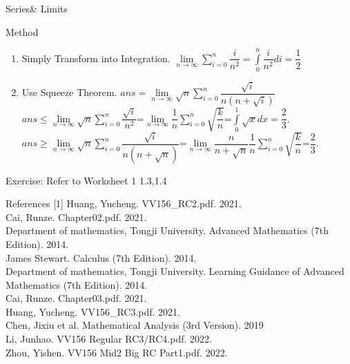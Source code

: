 \begin{frame}{Series\& Limits}

    \begin{block}{Method}
        \begin{enumerate}
            \item Simply Transform into Integration.
                  $\lim\limits_{n\to\infty}\sum\limits_{i=0}^{n}\dfrac{i}{n^2}=\int\limits_0^n \dfrac{i}{n^2} di=\dfrac{1}{2} $
            \item Use Squeeze Theorem.
                  $ans=\lim\limits_{n\to\infty}\sqrt{n}\sum\limits_{i=0}^{n}\dfrac{\sqrt{i}}{n(n+\sqrt{i})}$\\
                  $ans\leq\lim\limits_{n\to\infty}\sqrt{n}\sum\limits_{i=0}^{n}\dfrac{\sqrt{i}}{n^2}$=$\lim\limits_{n\to\infty}\dfrac{1}{n}\sum\limits_{i=0}^{n}\sqrt{\dfrac{k}{n}}$=$\int\limits_0^1 \sqrt{x}dx=\dfrac{2}{3}$.\\
                  $ans\geq \lim\limits_{n\to\infty}\sqrt{n}\sum\limits_{i=0}^{n}\dfrac{\sqrt{i}}{n(n+\sqrt{n})}$=$\lim\limits_{n\to\infty}\dfrac{n}{n+\sqrt{n}}\dfrac{1}{n}\sum\limits_{i=0}^{n}\sqrt{\dfrac{k}{n}}$=$\dfrac{2}{3}$.
        \end{enumerate}
    \end{block}
    Exercise: Refer to Worksheet 1 1.3,1.4
\end{frame}



\begin{frame}{References}
    \footnotesize
    [1] Huang, Yucheng. VV156\_RC2.pdf. 2021.\\
    \bigskip
    [2] Cai, Runze. Chapter02.pdf. 2021.\\
    \bigskip
    [3] Department of mathematics, Tongji University. Advanced Mathematics (7th Edition). 2014.\\
    \bigskip
    [4] James Stewart. Calculus (7th Edition). 2014.\\
    \bigskip
    [5] Department of mathematics, Tongji University. Learning Guidance of Advanced Mathematics (7th Edition). 2014.\\
    \bigskip
    [6] Cai, Runze. Chapter03.pdf. 2021.\\
    \bigskip
    [7] Huang, Yucheng. VV156\_RC3.pdf. 2021.\\
    \bigskip
    [8] Chen, Jixiu et al. Mathematical Analysis (3rd Version). 2019\\
    \bigskip
    [9] Li, Junhao. VV156 Regular RC3/RC4.pdf. 2022.\\
    \bigskip
    [10] Zhou, Yishen. VV156 Mid2 Big RC Part1.pdf. 2022.\\
    \normalsize
\end{frame}